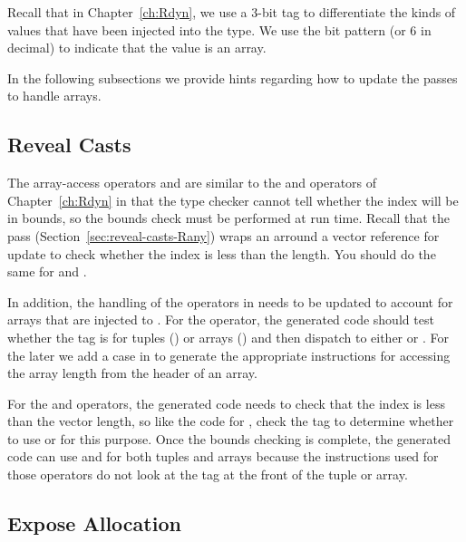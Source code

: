 \documentclass[11pt]{book}
\begin{document}
Recall that in Chapter~\ref{ch:Rdyn}, we use a $3$-bit tag to
differentiate the kinds of values that have been injected into the
 type. We use the bit pattern  (or $6$ in decimal)
to indicate that the value is an array.

In the following subsections we provide hints regarding how to update
the passes to handle arrays.


\subsection{Reveal Casts}

The array-access operators  and
 are similar to the  and
 operators of Chapter~\ref{ch:Rdyn} in
that the type checker cannot tell whether the index will be in bounds,
so the bounds check must be performed at run time.  Recall that the
 pass (Section~\ref{sec:reveal-casts-Rany}) wraps
an  arround a vector reference for update to check whether
the index is less than the length.  You should do the same for
 and  .

In addition, the handling of the  operators in
 needs to be updated to account for arrays that are
injected to . For the  operator, the
generated code should test whether the tag is for tuples ()
or arrays () and then dispatch to either
 or .  For the later
we add a case in  to generate the
appropriate instructions for accessing the array length from the
header of an array.

For the  and  operators,
the generated code needs to check that the index is less than the
vector length, so like the code for , check
the tag to determine whether to use  or
 for this purpose.  Once the bounds checking
is complete, the generated code can use  and
 for both tuples and arrays because the
instructions used for those operators do not look at the tag at the
front of the tuple or array.

\subsection{Expose Allocation}
\end{document}

